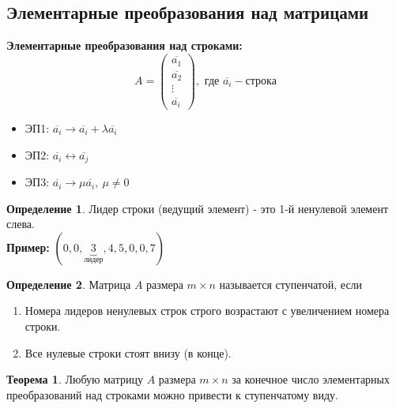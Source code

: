 \documentclass[a4paper, 12pt]{article}
\theoremstyle{definition}
\newtheorem*{definition}{Определение}
\newtheorem*{theorem}{Теорема}
\begin{document}
    \newpage
    \subsection{Элементарные преобразования над матрицами}
    \textbf{Элементарные преобразования над строками:} 
    $$A =\begin{pmatrix}
      \overline{a_1} \\
      \overline{a_2} \\
      \vdots \\
      \overline{a_i}
    \end{pmatrix}, \text{ где } \overline{a_i} - \text{строка}$$
    \begin{itemize}
      \item ЭП1: $\overline{a_i} \to \overline{a_i} + \lambda \overline{a_i}$
      \item ЭП2: $\overline{a_i} \longleftrightarrow   \overline{a_j}$
      \item ЭП3: $\overline{a_i} \to \mu \overline{a_i},\ \mu \neq 0$
  \end{itemize}
  \begin{definition}
    Лидер строки (ведущий элемент) - это 1-й ненулевой элемент слева. \\
    \textbf{Пример:} $(0, 0, \underbrace{3}_{\text{лидер}}, 4, 5, 0, 0, 7)$
  \end{definition}
  \begin{definition}
    Матрица $A$ размера $m\times n$ называется ступенчатой, если 
    \begin{enumerate}
      \item Номера лидеров ненулевых строк строго возрастают с увеличением номера строки.
      \item Все нулевые строки стоят внизу (в конце).
    \end{enumerate}
  \end{definition}
  \begin{theorem}
    Любую матрицу $A$ размера $m\times n$ за конечное число элементарных преобразований над строками можно привести к ступенчатому виду.
  \end{theorem}
\end{document}
